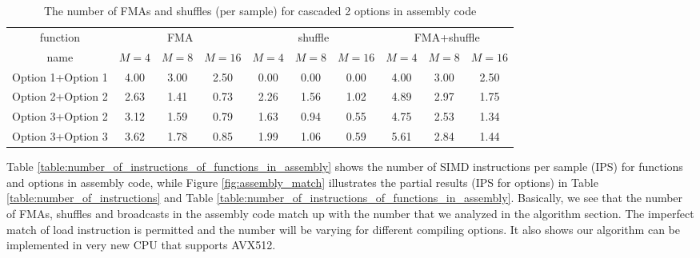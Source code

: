 \begin{table}[t]
    \caption{The number of FMAs and shuffles (per sample) for cascaded 2 options in assembly code}  %
    \centering %
    \setlength{\tabcolsep}{0.9pt}
    \begin{tabular}{c|c|c|c|c|c|c|c|c|c} %
    \hline\hline %
    function & \multicolumn{3}{c|}{FMA} & \multicolumn{3}{c|}{shuffle} & \multicolumn{3}{c}{FMA{+}shuffle} \\ [0.4ex]
    \cline{2-10}
    name & $M{=}4$ & $M{=}8$ & $M{=}16$ & $M{=}4$ & $M{=}8$ & $M{=}16$ & $M{=}4$ & $M{=}8$ & $M{=}16$ \\ [0.4ex] %
    \hline
    Option 1+Option 1 & 4.00 & 3.00 & 2.50 & 0.00 & 0.00 & 0.00 & 4.00 & 3.00 & 2.50 \\ [0.4ex]
    Option 2+Option 2 & 2.63 & 1.41 & 0.73 & 2.26 & 1.56 & 1.02 & 4.89 & 2.97 & 1.75 \\ [0.4ex]
    Option 3+Option 2 & 3.12 & 1.59 & 0.79 & 1.63 & 0.94 & 0.55 & 4.75 & 2.53 & 1.34 \\ [0.4ex]
    Option 3+Option 3 & 3.62 & 1.78 & 0.85 & 1.99 & 1.06 & 0.59 & 5.61 & 2.84 & 1.44 \\ [1ex]
    \hline
    \end{tabular}
    \label{table:number_of_instructions_of_cascaded2_in_assembly} %
\end{table}

Table \ref{table:number_of_instructions_of_functions_in_assembly} shows the number of SIMD instructions
per sample (IPS) for functions and options in assembly code, while Figure \ref{fig:assembly_match}
illustrates the partial results (IPS for options) in Table \ref{table:number_of_instructions} and Table \ref{table:number_of_instructions_of_functions_in_assembly}.
Basically, we see that the number of FMAs, shuffles and broadcasts in the assembly code match up with the number that we analyzed
in the algorithm section. The imperfect match of load instruction is permitted
and the number will be varying for different compiling options. 
It also shows our algorithm can be implemented in very new CPU that supports AVX512.

